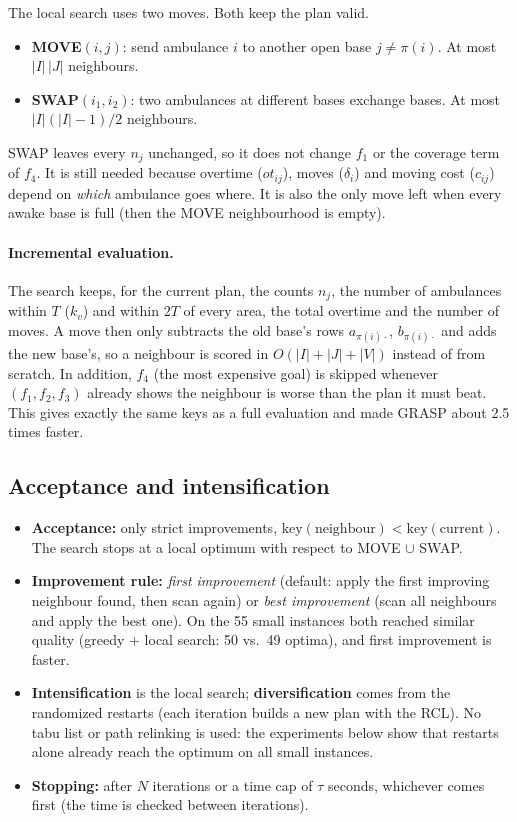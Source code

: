 The local search uses two moves. Both keep the plan valid.
\begin{itemize}[itemsep=2pt]
  \item \textbf{MOVE}$(i, j)$: send ambulance $i$ to another open base $j \neq \pi(i)$.
        At most $|I|\,|J|$ neighbours.
  \item \textbf{SWAP}$(i_1, i_2)$: two ambulances at different bases exchange bases.
        At most $|I|(|I|-1)/2$ neighbours.
\end{itemize}
SWAP leaves every $n_j$ unchanged, so it does not change $f_1$ or the coverage term of $f_4$.
It is still needed because overtime ($ot_{ij}$), moves ($\delta_i$) and moving cost ($c_{ij}$)
depend on \emph{which} ambulance goes where. It is also the only move left when every awake base
is full (then the MOVE neighbourhood is empty).

\paragraph{Incremental evaluation.} The search keeps, for the current plan, the counts $n_j$,
the number of ambulances within $T$ ($k_v$) and within $2T$ of every area, the total overtime
and the number of moves. A move then only subtracts the old base's rows $a_{\pi(i)\cdot}$,
$b_{\pi(i)\cdot}$ and adds the new base's, so a neighbour is scored in $O(|I| + |J| + |V|)$
instead of from scratch. In addition, $f_4$ (the most expensive goal) is skipped whenever
$(f_1, f_2, f_3)$ already shows the neighbour is worse than the plan it must beat. This gives
exactly the same keys as a full evaluation and made GRASP about 2.5 times faster.

\subsection{Acceptance and intensification}

\begin{itemize}[itemsep=2pt]
  \item \textbf{Acceptance:} only strict improvements, $\mathrm{key}(\text{neighbour}) <
        \mathrm{key}(\text{current})$. The search stops at a local optimum with respect to
        MOVE $\cup$ SWAP.
  \item \textbf{Improvement rule:} \emph{first improvement} (default: apply the first improving
        neighbour found, then scan again) or \emph{best improvement} (scan all neighbours and
        apply the best one). On the 55 small instances both reached similar quality
        (greedy + local search: 50 vs.\ 49 optima), and first improvement is faster.
  \item \textbf{Intensification} is the local search; \textbf{diversification} comes from the
        randomized restarts (each iteration builds a new plan with the RCL). No tabu list or path
        relinking is used: the experiments below show that restarts alone already reach the
        optimum on all small instances.
  \item \textbf{Stopping:} after $N$ iterations or a time cap of $\tau$ seconds, whichever
        comes first (the time is checked between iterations).
\end{itemize}

